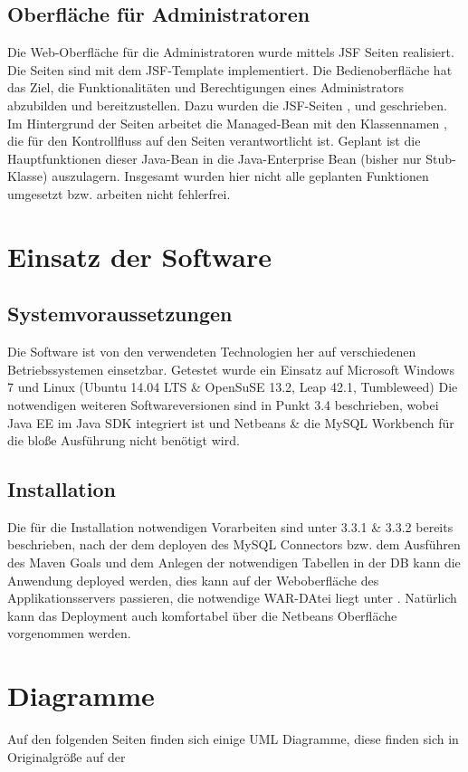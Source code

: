 \documentclass[12pt,a4paper,parskip]{scrreprt}
\begin{document}
\section{Oberfläche für Administratoren}
Die Web-Oberfläche für die Administratoren wurde mittels JSF Seiten realisiert. Die Seiten sind mit dem JSF-Template  implementiert. Die Bedienoberfläche hat das Ziel, die Funktionalitäten und Berechtigungen eines Administrators abzubilden und bereitzustellen. Dazu wurden die JSF-Seiten ,  und  geschrieben. Im Hintergrund der Seiten arbeitet die Managed-Bean mit den Klassennamen , die für den Kontrollfluss auf den Seiten verantwortlicht ist. Geplant ist die Hauptfunktionen dieser Java-Bean in die Java-Enterprise Bean  (bisher nur Stub-Klasse) auszulagern. Insgesamt wurden hier nicht alle geplanten Funktionen umgesetzt bzw. arbeiten nicht fehlerfrei.
\chapter{Einsatz der Software}
\section{Systemvoraussetzungen}
Die Software ist von den verwendeten Technologien her auf verschiedenen Betriebssystemen einsetzbar. Getestet wurde ein Einsatz auf Microsoft Windows 7 und Linux (Ubuntu 14.04 LTS \& OpenSuSE 13.2, Leap 42.1, Tumbleweed)
Die notwendigen weiteren Softwareversionen sind in Punkt 3.4 beschrieben, wobei Java EE im Java SDK integriert ist und Netbeans \& die MySQL Workbench für die bloße Ausführung nicht benötigt wird.
\section{Installation}
Die für die Installation notwendigen Vorarbeiten sind unter 3.3.1 \& 3.3.2 bereits beschrieben, nach der dem deployen  des MySQL Connectors bzw. dem Ausführen des Maven Goals und dem Anlegen der notwendigen Tabellen in der DB kann die Anwendung deployed werden, dies kann auf der Weboberfläche des Applikationsservers passieren, die notwendige WAR-DAtei liegt unter . Natürlich kann das Deployment auch komfortabel über die Netbeans Oberfläche vorgenommen werden.
\chapter{Diagramme}
Auf den folgenden Seiten finden sich einige UML Diagramme, diese finden sich in Originalgröße auf der 
\end{document}
